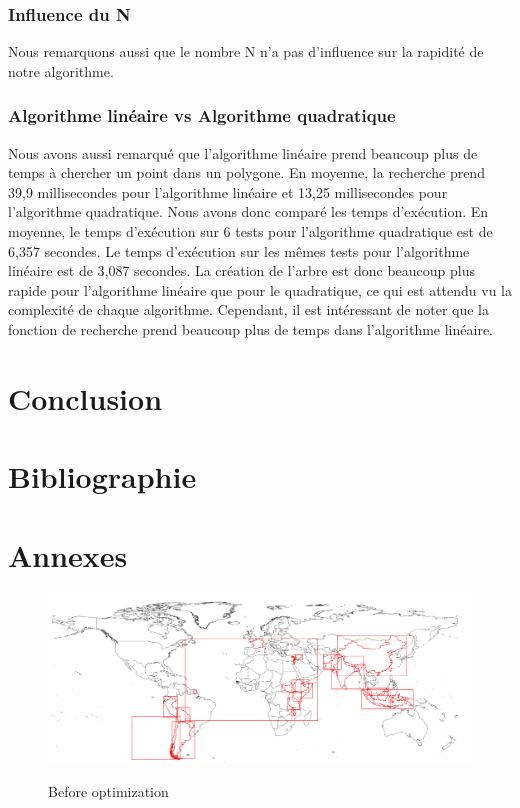 \documentclass[utf8]{article}
\begin{document}
\begin{large}
  \subsubsection{Influence du N}
  Nous remarquons aussi que le
  nombre N n'a pas d'influence sur la rapidité de notre algorithme.
  \subsubsection{Algorithme linéaire vs Algorithme quadratique}
  \par
  \indent
  Nous avons aussi remarqué que l'algorithme linéaire prend beaucoup plus de temps
  à chercher un point dans un polygone. En moyenne, la recherche prend 39,9
  millisecondes pour l'algorithme linéaire et 13,25 millisecondes pour
  l'algorithme quadratique. Nous avons donc comparé les temps d'exécution. En
  moyenne, le temps d'exécution sur 6 tests pour l'algorithme quadratique est de
  6,357 secondes. Le temps d'exécution sur les mêmes tests pour l'algorithme
  linéaire est de 3,087 secondes. La création de l'arbre est donc beaucoup plus
  rapide pour l'algorithme linéaire que pour le quadratique, ce qui est attendu vu
  la complexité de chaque algorithme. Cependant, il est intéressant de noter que
  la fonction de recherche prend beaucoup plus de temps dans l'algorithme
  linéaire.
  \par

  \section{Conclusion}
  \indent
  \par
  \par

  \section{Bibliographie}

  \section{Annexes}
  \begin{figure}[h]
    \caption{Before optimization}
    \includegraphics[width=\textwidth]{beforeopti.png}\label{fig:beforeopti}
  \end{figure}


\end{large}
\end{document}
